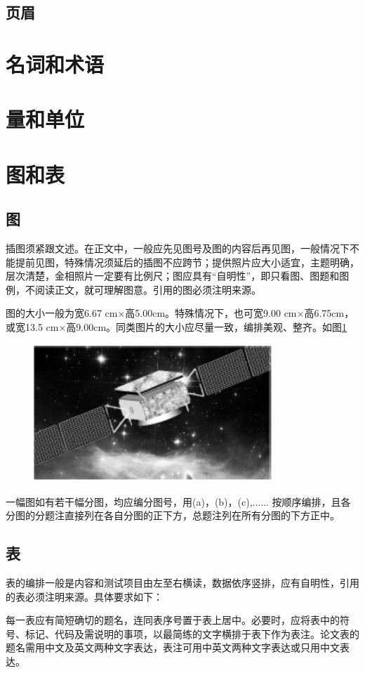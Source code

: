 \subsection{页眉}
\section{名词和术语}
\section{量和单位}
\section{图和表}
\subsection{图}
插图须紧跟文述。在正文中，一般应先见图号及图的内容后再见图，一般情况下不能提前见图，特殊情况须延后的插图不应跨节；提供照片应大小适宜，主题明确，层次清楚，金相照片一定要有比例尺；图应具有“自明性”，即只看图、图题和图例，不阅读正文，就可理解图意。引用的图必须注明来源。

图的大小一般为宽6.67 cm×高5.00cm。特殊情况下，也可宽9.00 cm×高6.75cm，或宽13.5 cm×高9.00cm。同类图片的大小应尽量一致，编排美观、整齐。如图\ref{fig:demo}
\begin{figure}[H]
    \includegraphics[width=9cm]{./Figures/demo}
    \centering
    \label{fig:demo}
\end{figure}
一幅图如有若干幅分图，均应编分图号，用(a)，(b)，(c),...... 按顺序编排，且各分图的分题注直接列在各自分图的正下方，总题注列在所有分图的下方正中。
\subsection{表}
表的编排一般是内容和测试项目由左至右横读，数据依序竖排，应有自明性，引用的表必须注明来源。具体要求如下：

每一表应有简短确切的题名，连同表序号置于表上居中。必要时，应将表中的符号、标记、代码及需说明的事项，以最简练的文字横排于表下作为表注。论文表的题名需用中文及英文两种文字表达，表注可用中英文两种文字表达或只用中文表达。

